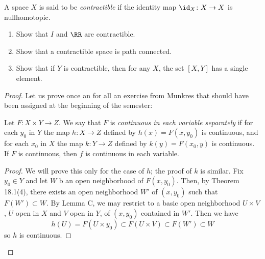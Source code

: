 \newpage
\begin{problem}[Munkres \S51, Ex.\,3(a,b,c,)]
A space $X$ is said to be \emph{contractible} if the identity map
$\id_X\colon X\to X$ is nullhomotopic.
\begin{enumerate}[label=(\alph*)]
\item Show that $I$ and $\RR$ are contractible.
\item Show that a contractible space is path connected.
\item Show that if $Y$ is contractible, then for any $X$, the set
  $[X,Y]$ has a single element.
\end{enumerate}
\end{problem}
\begin{proof}
Let us prove once an for all an exercise from Munkres that
should have been assigned at the beginning of the semester:
\begin{lemma}[Munkres, \S18, Ex.\,11]
Let $F\colon X\times Y\to Z$. We say that $F$ is \emph{continuous
in each variable separately} if for each $y_0$ in $Y$ the map
$h\colon X\to Z$ defined by
$h(x)=F(x,y_0)$ is continuous, and for each $x_0$ in $X$ the map
$k\colon Y\to Z$ defined by $k(y)=F(x_0,y)$ is continuous. If $F$
is continuous, then $f$ is continuous in each variable.
\end{lemma}
\begin{proof}
\renewcommand\qedsymbol{$\clubsuit$}
We will prove this only for the case of $h$; the proof of $k$ is
similar. Fix $y_0\in Y$ and let $W$ b an open neighborhood of
$F(x,y_0)$. Then, by Theorem 18.1(4), there exists an open
neighborhood $W'$ of $(x,y_0)$ such that $F(W')\subset W$. By
Lemma C, we may restrict to a basic open neighborhood $U\times
V$, $U$ open in $X$ and $V$ open in $Y$, of $(x,y_0)$ contained
in $W'$. Then we have
\[
h(U)=F(U\times y_0)\subset F(U\times V)\subset F(W')\subset W
\]
so $h$ is continuous.
\end{proof}


\end{proof}
